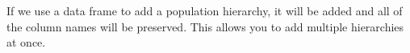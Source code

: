\documentclass[letterpaper]{article}\usepackage[]{graphicx}\usepackage[]{color}
\newcommand{\tab}{\hspace*{1em}}
\begin{document}
\noindent
If we use a data frame to add a population hierarchy, it will be added and all
of the column names will be preserved. This allows you to add multiple hierarchies
at once.

\end{document}
